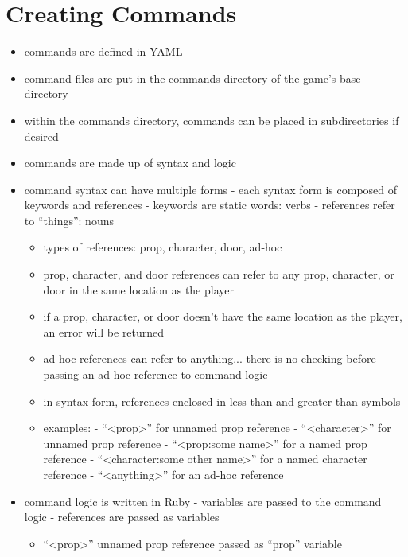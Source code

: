\documentclass[letterpaper,10pt,english]{manual}
\begin{document}
\section{Creating Commands}
\begin{itemize}
\item {} 
commands are defined in YAML

\item {} 
command files are put in the commands directory of the game's base directory

\item {} 
within the commands directory, commands can be placed in subdirectories if desired

\item {} 
commands are made up of syntax and logic

\item {} 
command syntax can have multiple forms
- each syntax form is composed of keywords and references
- keywords are static words: verbs
- references refer to ``things'': nouns
\begin{itemize}
\item {} 
types of references: prop, character, door, ad-hoc

\item {} 
prop, character, and door references can refer to any prop, character, or door in the same location as the player

\item {} 
if a prop, character, or door doesn't have the same location as the player, an error will be returned

\item {} 
ad-hoc references can refer to anything... there is no checking before passing an ad-hoc reference to command logic

\item {} 
in syntax form, references enclosed in less-than and greater-than symbols

\item {} 
examples:
- ``\textless{}prop\textgreater{}'' for unnamed prop reference
- ``\textless{}character\textgreater{}'' for unnamed prop reference
- ``\textless{}prop:some name\textgreater{}'' for a named prop reference
- ``\textless{}character:some other name\textgreater{}'' for a named character reference
- ``\textless{}anything\textgreater{}'' for an ad-hoc reference

\end{itemize}

\item {} 
command logic is written in Ruby
- variables are passed to the command logic
- references are passed as variables
\begin{itemize}
\item {} 
``\textless{}prop\textgreater{}'' unnamed prop reference passed as ``prop'' variable


\end{itemize}
\end{itemize}
\end{document}
